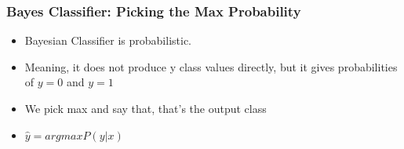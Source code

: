 \begin{frame}[fragile]\frametitle{Bayes Classifier: Picking the Max Probability}
	\begin{itemize}
	\item Bayesian Classifier is probabilistic.
	\item Meaning, it does not produce y class values directly,  but it gives probabilities of $y=0$ and $y=1$
	\item We pick max and say that, that's the output class
	\item $\hat{y} = arg max P (y|x)$
	\end{itemize}

\end{frame}




